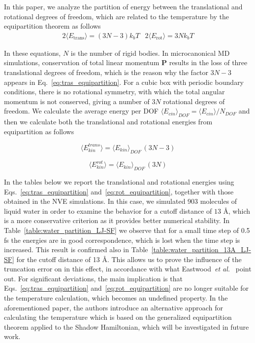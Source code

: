\documentclass[aip,jcp,reprint,amsmath,amssymb]{revtex4-1}
\begin{document}
In this paper, we analyze the partition of energy between the translational and rotational degrees of freedom, which are related to the temperature by the equipartition theorem as follows
\begin{subequations}
\begin{align}
\label{eq:tras_equipartition}
2 \langle E_\text{trans} \rangle = (3N - 3) k_b T
\end{align}
\begin{align}
\label{eq:rot_equipartition}
2 \langle E_\text{rot} \rangle = 3N k_b T
\end{align} 
\end{subequations}

In these equations, $N$ is the number of rigid bodies. In microcanonical MD simulations, conservation of total linear momentum $\boldsymbol{P}$ results in the loss of three translational degrees of freedom, which is the reason why the factor $3N-3$ appears in Eq.~\ref{eq:tras_equipartition}. For a cubic box with periodic boundary conditions, there is no rotational symmetry,\cite{Frenkel_2013, Kuzkin_2014} with which the total angular momentum is not conserved, giving a number of $3N$ rotational degrees of freedom. We calculate the average energy per DOF $\langle E_{cin} \rangle_{DOF} = \langle E_{cin} \rangle /N_{DOF}$ and then we calculate both the translational and rotational energies from equipartition as follows

\begin{equation}
\langle E_{kin}^{trans}\rangle =  \langle E_{kin} \rangle_{DOF} \, (3N-3)
\end{equation}

\begin{equation}
\langle E_{kin}^{rot} \rangle =  \langle E_{kin} \rangle_{DOF} \, (3N)
\end{equation}

In the tables below we report the translational and rotational energies using Eqs.~\ref{eq:tras_equipartition} and~\ref{eq:rot_equipartition}, together with those obtained in the NVE simulations. In this case, we simulated 903 molecules of liquid water in order to examine the behavior for a cutoff distance of $13$ {\AA}, which is a more conservative criterion as it provides better numerical stability. In Table~\ref{table:water_partition_LJ-SF} we observe that for a small time step of 0.5 fs the energies are in good correspondence, which is lost when the time step is increased. This result is confirmed also in Table~\ref{table:water_partition_13A_LJ-SF} for the cutoff distance of 13 {\AA}. This allows us to prove the influence of the truncation error on in this effect, in accordance with what Eastwood~\textit{et al.}~\cite{Eastwood_2010} point out. For significant deviations, the main implication is that Eqs.~\ref{eq:tras_equipartition} and~\ref{eq:rot_equipartition} are no longer suitable for the temperature calculation, which becomes an undefined property. In the aforementioned paper, the authors introduce an alternative approach for calculating the temperature which is based on the generalized equipartition theorem applied to the Shadow Hamiltonian, which will be investigated in future work.
\end{document}
